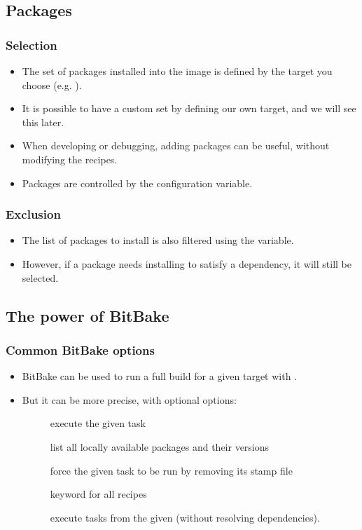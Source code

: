 \subsection{Packages}

\begin{frame}
  \frametitle{Selection}
  \begin{itemize}
    \item The set of packages installed into the image is defined by
      the target you choose (e.g. ).
    \item It is possible to have a custom set by defining our own
      target, and we will see this later.
    \item When developing or debugging, adding packages can be useful,
      without modifying the recipes.
    \item Packages are controlled by the 
      configuration variable.
  \end{itemize}
\end{frame}

\begin{frame}
  \frametitle{Exclusion}
  \begin{itemize}
    \item The list of packages to install is also filtered using the
       variable.
    \item However, if a package needs installing to satisfy a
      dependency, it will still be selected.
  \end{itemize}
\end{frame}

\subsection{The power of BitBake}

\begin{frame}
  \frametitle{Common BitBake options}
  \begin{itemize}
    \item BitBake can be used to run a full build for a given target
      with .
    \item But it can be more precise, with optional options:
    \begin{description}
      \item[] execute the given task
      \item[] list all locally available packages and their
        versions
      \item[] force the given task to be run by removing its
        stamp file
      \item[] keyword for all recipes
      \item[] execute tasks from the given
         (without resolving dependencies).
    \end{description}
  \end{itemize}
\end{frame}

